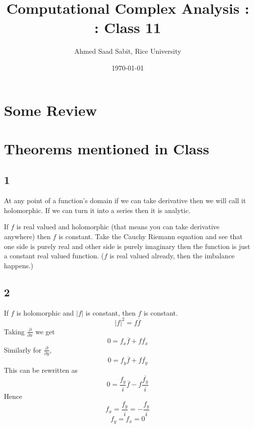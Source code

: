 \documentclass[letter]{article}
\title{Computational Complex Analysis : : Class 11}
\author{Ahmed Saad Sabit, Rice University}
\date{\today}
\begin{document}
\maketitle
\section*{Some Review}


\section*{Theorems mentioned in Class} 
\subsection*{1}
At any point of a function's domain if we can take derivative then we will call it holomorphic. If we can turn it into a series then it is analytic.


If $f$ is real valued and holomorphic (that means you can take derivative anywhere) then $f$ is constant. Take the Cauchy Riemann equation and see that one side is purely real and other side is purely imaginary then the function is just a constant real valued function. ($f$ is real valued already, then the imbalance happens.)

\subsection*{2}
If $f$ is holomorphic and $|f|$ is constant, then $f$ is constant. 
\[
	|f|^2 = f \overline{f} 
\]
Taking $\frac{\partial}{\partial x}$ we get
\[
0 = f_x \overline{f} + f \overline{f_x}
\] 
Similarly for $\frac{\partial }{\partial y}$, 
\[
0 = f_y \overline{f} + f \overline{f_y}
\] 
This can be rewritten as 
\[
	0 = \frac{f_y}{i} \overline{f} - f \frac{\overline{f_y}}{i}
\]
Hence 
\[
f_x = \frac{f_y}{i} = - \frac{f_y}{i} 
\] 
\[
f_y = f_x = 0
\] 
\end{document}
